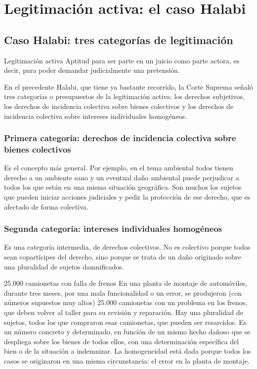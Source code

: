 \documentclass[12pt,oneside]{book}
\begin{document}
\chapter{Legitimación activa: el caso Halabi}

\section{Caso Halabi: tres categorías de legitimación}

\begin{definition}{Legitimación activa}
Aptitud para ser parte en un juicio como parte actora, es decir, para poder demandar judicialmente una pretensión.
\end{definition}

En el precedente Halabi, que tiene ya bastante recorrido, la Corte Suprema señaló tres categorías o presupuestos de la legitimación activa: los derechos subjetivos, los derechos de incidencia colectiva sobre bienes colectivos y los derechos de incidencia colectiva sobre intereses individuales homogéneos.

\subsection{Primera categoría: derechos de incidencia colectiva sobre bienes colectivos}

Es el concepto más general. Por ejemplo, en el tema ambiental todos tienen derecho a un ambiente sano y un eventual daño ambiental puede perjudicar a todos los que están en una misma situación geográfica. Son muchos los sujetos que pueden iniciar acciones judiciales y pedir la protección de ese derecho, que es afectado de forma colectiva.

\subsection{Segunda categoría: intereses individuales homogéneos}

Es una categoría intermedia, de derechos colectivos. No es colectivo porque todos sean copartícipes del derecho, sino porque se trata de un daño originado sobre una pluralidad de sujetos damnificados.

\begin{example}{25.000 camionetas con falla de frenos}
En una planta de montaje de automóviles, durante tres meses, por una mala funcionalidad o un error, se produjeron (con números supuestos muy altos) 25.000 camionetas con un problema en los frenos, que deben volver al taller para su revisión y reparación. Hay una pluralidad de sujetos, todos los que compraron esas camionetas, que pueden ser resarcidos. Es un número concreto y determinado, en función de un mismo hecho dañoso que se despliega sobre los bienes de todos ellos, con una determinación específica del bien o de la situación a indemnizar. La homogeneidad está dada porque todos los casos se originaron en una misma circunstancia: el error en la planta de montaje.
\end{example}
\end{document}
